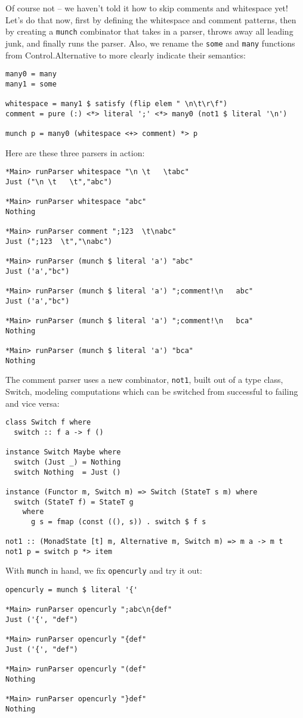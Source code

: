 \documentclass{tmr}
\begin{document}
Of course not -- we haven't told it how to skip comments and whitespace yet!
Let's do that now, first by defining the whitespace and comment patterns, then
by creating a \verb+munch+ combinator that takes in a parser, 
throws away all leading junk, and finally runs the parser.  Also, we rename
the \verb+some+ and \verb+many+ functions from Control.Alternative to more
clearly indicate their semantics:
\begin{verbatim}
many0 = many
many1 = some

whitespace = many1 $ satisfy (flip elem " \n\t\r\f")
comment = pure (:) <*> literal ';' <*> many0 (not1 $ literal '\n')

munch p = many0 (whitespace <+> comment) *> p
\end{verbatim}

Here are these three parsers in action:
\begin{verbatim}
*Main> runParser whitespace "\n \t   \tabc"
Just ("\n \t   \t","abc")

*Main> runParser whitespace "abc"
Nothing

*Main> runParser comment ";123  \t\nabc"
Just (";123  \t","\nabc")

*Main> runParser (munch $ literal 'a') "abc"
Just ('a',"bc")

*Main> runParser (munch $ literal 'a') ";comment!\n   abc"
Just ('a',"bc")

*Main> runParser (munch $ literal 'a') ";comment!\n   bca"
Nothing

*Main> runParser (munch $ literal 'a') "bca"
Nothing
\end{verbatim}

The comment parser uses a new combinator, \verb+not1+, built out of a 
type class, Switch, modeling computations which can be switched from
successful to failing and vice versa:
\begin{verbatim}
class Switch f where
  switch :: f a -> f ()

instance Switch Maybe where
  switch (Just _) = Nothing
  switch Nothing  = Just ()

instance (Functor m, Switch m) => Switch (StateT s m) where
  switch (StateT f) = StateT g
    where 
      g s = fmap (const ((), s)) . switch $ f s

not1 :: (MonadState [t] m, Alternative m, Switch m) => m a -> m t
not1 p = switch p *> item
\end{verbatim}

With \verb+munch+ in hand, we fix \verb+opencurly+ and try it out:
\begin{verbatim}
opencurly = munch $ literal '{'

*Main> runParser opencurly ";abc\n{def"
Just ('{', "def")

*Main> runParser opencurly "{def"
Just ('{', "def")

*Main> runParser opencurly "(def"
Nothing

*Main> runParser opencurly "}def"
Nothing
\end{verbatim}
\end{document}

